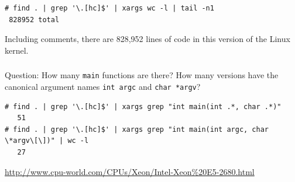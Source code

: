 \documentclass{article}
\begin{document}
\subsubsection{}
\begin{verbatim}
# find . | grep '\.[hc]$' | xargs wc -l | tail -n1
 828952 total
\end{verbatim}
Including comments, there are 828,952 lines of code in this version of the Linux kernel.

\subsubsection{}
Question: How many \texttt{main} functions are there? How many versions have the canonical argument names \texttt{int argc} and \texttt{char *argv}?

\begin{verbatim}
# find . | grep '\.[hc]$' | xargs grep "int main(int .*, char .*)"
   51
# find . | grep '\.[hc]$' | xargs grep "int main(int argc, char \*argv\[\])" | wc -l
   27
\end{verbatim}

\begin{thebibliography}{9}
 \url{http://www.cpu-world.com/CPUs/Xeon/Intel-Xeon%20E5-2680.html}
\end{thebibliography}
\end{document}
